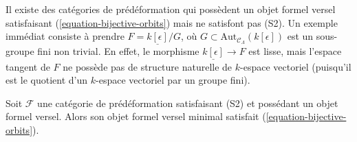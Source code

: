\begin{example}
\label{example-do-not-get-S2}
Il existe des catégories de prédéformation qui possèdent un objet formel
versel satisfaisant (\ref{equation-bijective-orbits}) mais ne satisfont pas
(S2). Un exemple immédiat consiste à prendre
$F = \underline{k[\epsilon]}/G$, où
$G \subset \text{Aut}_{\mathcal{C}_\Lambda}(k[\epsilon])$ est un sous-groupe
fini non trivial. En effet, le morphisme $\underline{k[\epsilon]} \to F$ est
lisse, mais l'espace tangent de $F$ ne possède pas de structure naturelle de
$k$-espace vectoriel (puisqu'il est le quotient d'un $k$-espace vectoriel par
un groupe fini).
\end{example}

\begin{lemma}
\label{lemma-construct-bijective-orbits}
Soit $\mathcal{F}$ une catégorie de prédéformation satisfaisant (S2) et
possédant un objet formel versel. Alors son objet formel versel minimal
satisfait (\ref{equation-bijective-orbits}).
\end{lemma}

